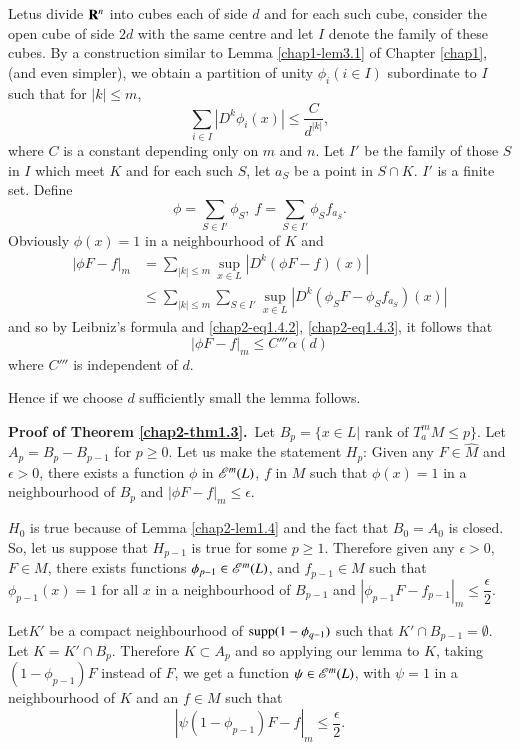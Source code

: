 Let\pageoriginale us divide $\mathbf{R}^{n}$ into cubes each of side $d$ and for each such cube, consider the open cube of side $2d$ with the same centre and let $I$ denote the family of these cubes. By a construction similar to Lemma \ref{chap1-lem3.1} of Chapter \ref{chap1}, (and even simpler), we obtain a partition of unity $\phi_{i}(i\in I)$ subordinate to $I$ such that for $|k|\leq m$,
\begin{equation*}
\sum\limits_{i\in I}|D^{k}\phi_{i}(x)|\leq \dfrac{C}{d^{|k|}},\tag{1.4.3}\label{chap2-eq1.4.3}
\end{equation*}
where $C$ is a constant depending only on $m$ and $n$. Let $I'$ be the family of those $S$ in $I$ which meet $K$ and for each such $S$, let $a_{S}$ be a point in $S\cap K$. $I'$ is a finite set. Define
$$
\phi=\sum\limits_{S\in I'}\phi_{S}, \ f=\sum\limits_{S\in I'}\phi_{S}f_{a_{S}}.
$$
Obviously $\phi(x)=1$ in a neighbourhood of $K$ and 
\begin{align*}
|\phi F-f|_{m} &= \sum\limits_{|k|\leq m}\sup\limits_{x\in L}|D^{k}(\phi F-f)(x)|\\
&\leq \sum\limits_{|k|\leq m}\sum\limits_{S\in I'}\sup\limits_{x\in L}|D^{k}(\phi_{S}F-\phi_{S}f_{a_{S}})(x)|
\end{align*}
and so by Leibniz's formula and \eqref{chap2-eq1.4.2}, \eqref{chap2-eq1.4.3}, it follows that
$$
|\phi F-f|_{m}\leq C''' \alpha(d)
$$
where $C'''$ is independent of $d$.

Hence if we choose $d$ sufficiently small the lemma follows.

\medskip
\noindent
{\bf Proof of Theorem \ref{chap2-thm1.3}.}~Let $B_{p}=\{x\in L|\text{~rank of~}T^{m}_{a}M\leq p\}$. Let $A_{p}=B_{p}-B_{p-1}$ for $p\geq 0$. Let us make the statement $H_{p}$: Given any $F\in\widehat{M}$ and $\epsilon>0$, there exists a function $\phi$ in $\mathscr{E}^{m}(L)$, $f$ in $M$ such that $\phi(x)=1$ in a neighbourhood of $B_{p}$ and $|\phi F-f|_{m}\leq \epsilon$.

$H_{0}$ is true because of Lemma \ref{chap2-lem1.4} and the fact that $B_{0}=A_{0}$ is closed. So, let us suppose that $H_{p-1}$ is true for some $p\geq 1$. Therefore given any $\epsilon>0$, $F\in M$, there exists functions $\phi_{p-1}\in \mathscr{E}^{m}(L)$, and $f_{p-1}\in M$ such that $\phi_{p-1}(x)=1$ for all $x$ in a neighbourhood of $B_{p-1}$ and $|\phi_{p-1}F-f_{p-1}|_{m}\leq \dfrac{\epsilon}{2}$.

Let\pageoriginale $K'$ be a compact neighbourhood of $\operatorname{supp} (1-\phi_{q-1})$ such that $K'\cap B_{p-1}=\emptyset$. Let $K=K'\cap B_{p}$. Therefore $K\subset A_{p}$ and so applying our lemma to $K$, taking $(1-\phi_{p-1})F$ instead of $F$, we get a function $\psi\in \mathscr{E}^{m}(L)$, with $\psi=1$ in a neighbourhood of $K$ and an $f\in M$ such that
$$
|\psi(1-\phi_{p-1})F-f|_{m}\leq \dfrac{\epsilon}{2}.
$$

